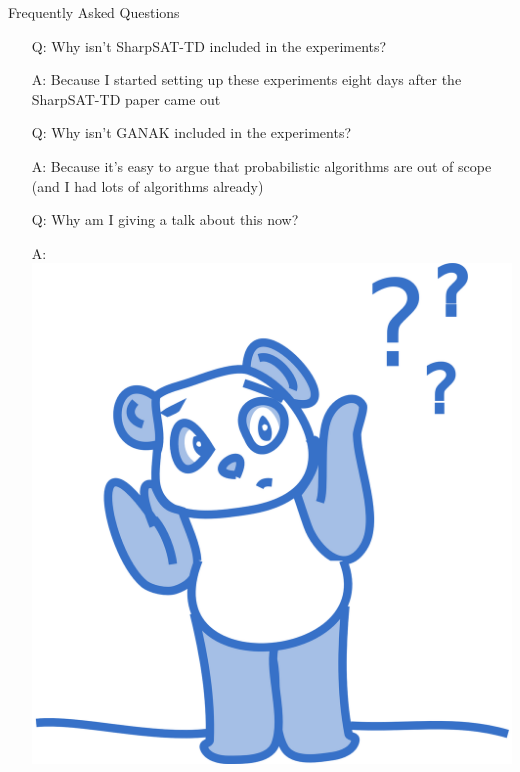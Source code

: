 \documentclass{beamer}
\begin{document}
\begin{frame}{Frequently Asked Questions}
  \begin{itemize}
    \item[Q:] \pause Why isn't \alert{SharpSAT-TD} included in the experiments?
    \item[A:] Because I started setting up these experiments \alert{eight days}
          after the \alert{SharpSAT-TD} paper came out
    \item[Q:] \pause Why isn't \alert{GANAK} included in the experiments?
    \item[A:] Because it's easy to argue that probabilistic algorithms are
          \alert{out of scope} (and I had lots of algorithms already)
    \item[Q:] \pause Why am I giving a talk about this \alert{now}?
    \item[A:] \includegraphics[width=0.3\linewidth]{shrug}
  \end{itemize}
\end{frame}
\end{document}
